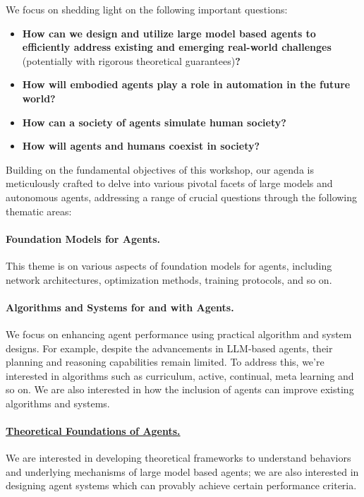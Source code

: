 \documentclass[10pt]{article} %
\newcounter{exa}
\begin{document}
We focus on shedding light on the following important questions:
\begin{itemize}
    \item {\bf How can we design and utilize large model based agents to efficiently address existing and emerging real-world challenges} (potentially with rigorous theoretical guarantees){\bf ?}
    \item {\bf How will embodied agents play a role in automation in the future world?} 
    \item {\bf How can a society of agents simulate human society?}
    \item {\bf How will agents and humans coexist in society?}
\end{itemize}

Building on the fundamental objectives of this workshop, our agenda is meticulously crafted to delve into various pivotal facets of large models and autonomous agents, addressing a range of crucial questions through the following thematic areas:


\paragraph{Foundation Models for Agents.} This theme is on various aspects of foundation models for agents, including network architectures, optimization methods, training protocols, and so on.

\paragraph{Algorithms and Systems for and with Agents.} We focus on enhancing agent performance using practical algorithm and system designs. For example, despite the advancements in LLM-based agents, their planning and reasoning capabilities remain limited. To address this, we're interested in algorithms such as curriculum, active, continual, meta learning and so on. We are also interested in how the inclusion of agents can improve existing algorithms and systems.

\paragraph{\underline{Theoretical Foundations of Agents.}} We are interested in developing theoretical frameworks to understand behaviors and underlying mechanisms of large model based agents; we are also interested in designing agent systems which can provably achieve certain performance criteria.
\end{document}

